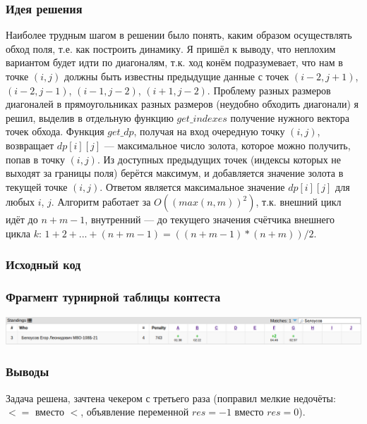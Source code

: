 \subsubsection*{Идея решения}

Наиболее трудным шагом в решении было понять, каким образом осуществлять обход поля, т.е. как построить динамику. Я пришёл к выводу, что неплохим вариантом будет идти по диагоналям, т.к. ход конём подразумевает, что нам в точке $(i, j)$ должны быть известны предыдущие данные с точек $(i - 2, j + 1)$, $(i - 2, j - 1)$, $(i - 1, j - 2)$, $(i + 1, j - 2)$. Проблему разных размеров диагоналей в прямоугольниках разных размеров (неудобно обходить диагонали) я решил, выделив в отдельную функцию $get\_indexes$ получение нужного вектора точек обхода. Функция $get\_dp$, получая на вход очередную точку $(i, j)$, возвращает $dp[i][j]$ --- максимальное число золота, которое можно получить, попав в точку $(i, j)$. Из доступных предыдущих точек (индексы которых не выходят за границы поля) берётся максимум, и добавляется значение золота в текущей точке $(i, j)$. Ответом является максимальное значение $dp[i][j]$ для любых $i$, $j$. Алгоритм работает за $O((max(n, m))^2)$, т.к. внешний цикл идёт до $n + m - 1$, внутренний --- до текущего значения счётчика внешнего цикла $k$: $1 + 2 + ... + (n + m - 1) = ((n + m - 1) * (n + m)) / 2$.

\subsubsection*{Исходный код}


\subsubsection*{Фрагмент турнирной таблицы контеста}
\begin{center}
\includegraphics[width=\textwidth]{standings/20220705/table.png}\newline\noindent
\end{center}

\subsubsection*{Выводы}

Задача решена, зачтена чекером с третьего раза (поправил мелкие недочёты: $<=$ вместо $<$, объявление переменной $res = -1$ вместо $res = 0$).


